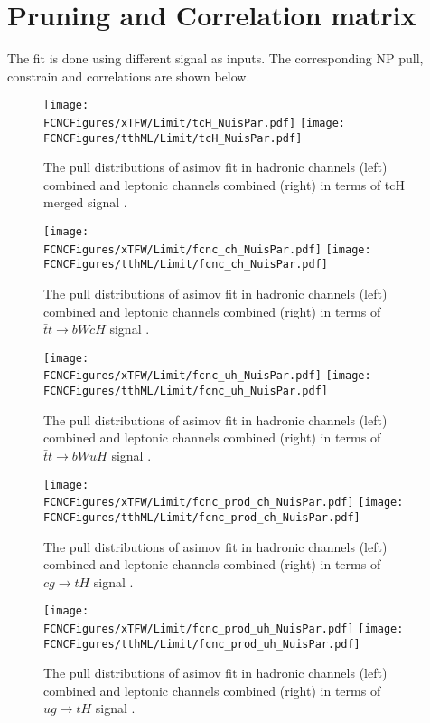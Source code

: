 \section{Pruning and Correlation matrix}

The fit is done using different signal as inputs. The corresponding NP pull, constrain and correlations are shown below.
\begin{figure}[htb]
\centering
\texttt{[image: \\FCNCFigures/xTFW/Limit/tcH\_NuisPar.pdf]}
\texttt{[image: \\FCNCFigures/tthML/Limit/tcH\_NuisPar.pdf]}
\caption{ The pull distributions of asimov fit in hadronic channels (left) combined and leptonic channels combined (right) in terms of tcH merged signal . }
\label{fig:tcH_NuisPar}
\end{figure}

\begin{figure}[htb]
\centering
\texttt{[image: \\FCNCFigures/xTFW/Limit/fcnc\_ch\_NuisPar.pdf]}
\texttt{[image: \\FCNCFigures/tthML/Limit/fcnc\_ch\_NuisPar.pdf]}
\caption{ The pull distributions of asimov fit in hadronic channels (left) combined and leptonic channels combined (right) in terms of $\bar{t}t\to bWcH$ signal . }
\label{fig:fcnc_ch_NuisPar}
\end{figure}

\begin{figure}[htb]
\centering
\texttt{[image: \\FCNCFigures/xTFW/Limit/fcnc\_uh\_NuisPar.pdf]}
\texttt{[image: \\FCNCFigures/tthML/Limit/fcnc\_uh\_NuisPar.pdf]}
\caption{ The pull distributions of asimov fit in hadronic channels (left) combined and leptonic channels combined (right) in terms of $\bar{t}t\to bWuH$ signal . }
\label{fig:fcnc_uh_NuisPar}
\end{figure}

\begin{figure}[htb]
\centering
\texttt{[image: \\FCNCFigures/xTFW/Limit/fcnc\_prod\_ch\_NuisPar.pdf]}
\texttt{[image: \\FCNCFigures/tthML/Limit/fcnc\_prod\_ch\_NuisPar.pdf]}
\caption{ The pull distributions of asimov fit in hadronic channels (left) combined and leptonic channels combined (right) in terms of $cg\to tH$ signal . }
\label{fig:fcnc_prod_ch_NuisPar}
\end{figure}

\begin{figure}[htb]
\centering
\texttt{[image: \\FCNCFigures/xTFW/Limit/fcnc\_prod\_uh\_NuisPar.pdf]}
\texttt{[image: \\FCNCFigures/tthML/Limit/fcnc\_prod\_uh\_NuisPar.pdf]}
\caption{ The pull distributions of asimov fit in hadronic channels (left) combined and leptonic channels combined (right) in terms of $ug\to tH$ signal . }
\label{fig:fcnc_prod_uh_NuisPar}
\end{figure}


